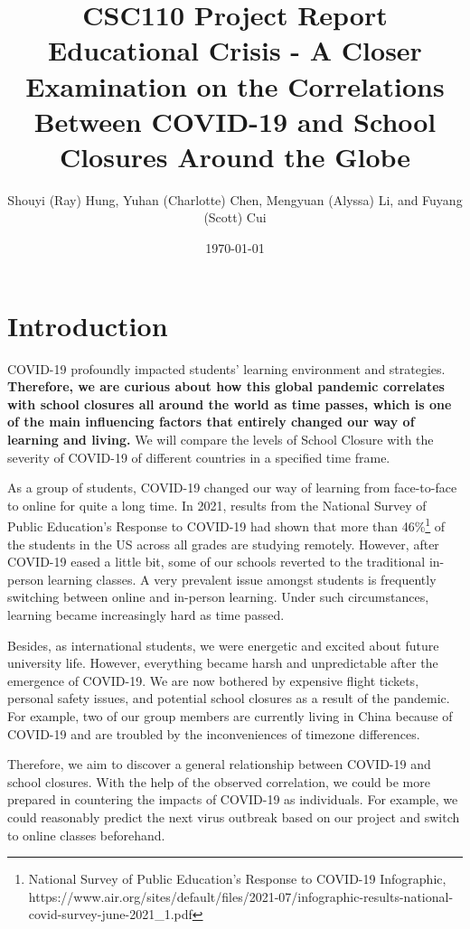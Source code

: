 \documentclass[fontsize=11pt]{article}
\title{CSC110 Project Report\\ Educational Crisis - A Closer Examination on the Correlations Between COVID-19 and School Closures Around the Globe}
\author{Shouyi (Ray) Hung, Yuhan (Charlotte) Chen, Mengyuan (Alyssa) Li, and Fuyang (Scott) Cui}
\date{\today}
\begin{document}
    \maketitle

    \tableofcontents

    \newpage

    \section{Introduction}

    COVID-19 profoundly impacted students' learning environment and strategies. \textbf{Therefore, we are curious about how this global pandemic correlates with school closures all around the world as time passes, which is one of the main influencing factors that entirely changed our way of learning and living.} We will compare the levels of School Closure with the severity of COVID-19 of different countries in a specified time frame.

    As a group of students, COVID-19 changed our way of learning from face-to-face to online for quite a long time. In 2021, results from the National Survey of Public Education's Response to COVID-19 had shown that more than 46\%\footnote{National Survey of Public Education's Response to COVID-19 Infographic, https://www.air.org/sites/default/files/2021-07/infographic-results-national-covid-survey-june-2021\_1.pdf} of the students in the US across all grades are studying remotely. However, after COVID-19 eased a little bit, some of our schools reverted to the traditional in-person learning classes. A very prevalent issue amongst students is frequently switching between online and in-person learning. Under such circumstances, learning became increasingly hard as time passed.

    Besides, as international students, we were energetic and excited about future university life. However, everything became harsh and unpredictable after the emergence of COVID-19. We are now bothered by expensive flight tickets, personal safety issues, and potential school closures as a result of the pandemic. For example, two of our group members are currently living in China because of COVID-19 and are troubled by the inconveniences of timezone differences.

    Therefore, we aim to discover a general relationship between COVID-19 and school closures. With the help of the observed correlation, we could be more prepared in countering the impacts of COVID-19 as individuals. For example, we could reasonably predict the next virus outbreak based on our project and switch to online classes beforehand.
\end{document}
